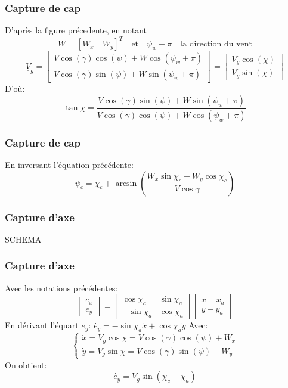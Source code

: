 \documentclass[tikz, footheight=2em]{beamer}
\begin{document}
\begin{frame}
    \frametitle{Capture de cap} \pause{}
    D'après la figure précedente, en notant
    \[ \underline{W} = {[W_x \quad W_y]}^T \quad \text{et}\quad \psi_w +
    \pi \quad \text{la direction du vent}\] \pause{}
    \[
    \underline{V}_g
    =
    \left[
    \begin{array}{c}
        V \cos (\gamma) \cos (\psi) + W \cos (\psi_w + \pi) \\
        V \cos (\gamma) \sin (\psi) + W \sin (\psi_w + \pi)
    \end{array}
    \right]
    =
    \left[
    \begin{array}{c}
        V_{g} \cos (\chi) \\
        V_{g} \sin (\chi)
    \end{array}
    \right]
    \] \pause{}
    D'où:
    \[
    \tan \chi = \frac
    {V \cos (\gamma) \sin (\psi) + W \sin (\psi_w + \pi)}
    {V \cos (\gamma) \cos (\psi) + W \cos (\psi_w + \pi)}
    \]
\end{frame}

\begin{frame}
    \frametitle{Capture de cap} \pause{}
    En inversant l'équation précédente:
    \[
    \boxed{
    \psi_c=
    \chi_c + \arcsin
    \left(
    \frac
    {W_x \sin \chi_c - W_y \cos \chi_c}
    {V \cos \gamma}
    \right)
    }
    \]
\end{frame}

\begin{frame}
    \frametitle{Capture d'axe} \pause{}
    \begin{center}
        SCHEMA
    \end{center}
\end{frame}

\begin{frame}
    \frametitle{Capture d'axe} \pause{}
    Avec les notations précédentes:
    \[
    \left[
    \begin{array}{c}
        e_x \\
        e_y
    \end{array}
    \right]
    =
    \left[
    \begin{array}{cc}
        \cos \chi_a & \sin \chi_a \\
        - \sin \chi_a & \cos \chi_a
    \end{array}
    \right]
    \left[
    \begin{array}{c}
        x - x_a \\
        y - y_a
    \end{array}
    \right]
    \]
    En dérivant l'équart \( e_y \):
    \(
    \dot{e_y} = - \sin \chi_a \dot{x} + \cos \chi_a \dot{y}
    \)
    Avec:
    \[
    \left \{
    \begin{array}{l}
        \dot{x} = V_g \cos \chi = V \cos (\gamma) \cos (\psi) + W_x \\
        \dot{y} = V_g \sin \chi = V \cos (\gamma) \sin (\psi) + W_y
    \end{array}
    \right.
    \]
    On obtient:
    \[
    \dot{e_y} = V_g \sin (\chi_c - \chi_a)
    \]
\end{frame}
\end{document}
